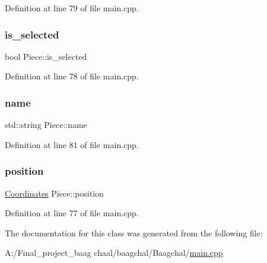 Definition at line 79 of file main.\+cpp.

\mbox{\label{class_piece_a21b7b54849acd46163b4b6281b5b0e57}} 
\subsubsection{\texorpdfstring{is\_selected}{is\_selected}}
{\footnotesize\ttfamily bool Piece\+::is\+\_\+selected}



Definition at line 78 of file main.\+cpp.

\mbox{\label{class_piece_aceb5b0dda6aa7ac881abe103bb98ac7e}} 
\subsubsection{\texorpdfstring{name}{name}}
{\footnotesize\ttfamily std\+::string Piece\+::name}



Definition at line 81 of file main.\+cpp.

\mbox{\label{class_piece_a3a789618e64cb8139a2bc79f44bb6edb}} 
\subsubsection{\texorpdfstring{position}{position}}
{\footnotesize\ttfamily \mbox{\hyperlink{class_coordinates}{Coordinates}} Piece\+::position}



Definition at line 77 of file main.\+cpp.



The documentation for this class was generated from the following file\+:\begin{DoxyCompactItemize}
\item 
A\+:/\+Final\+\_\+project\+\_\+baag chaal/baagchal/\+Baagchal/\mbox{\hyperlink{main_8cpp}{main.\+cpp}}\end{DoxyCompactItemize}
